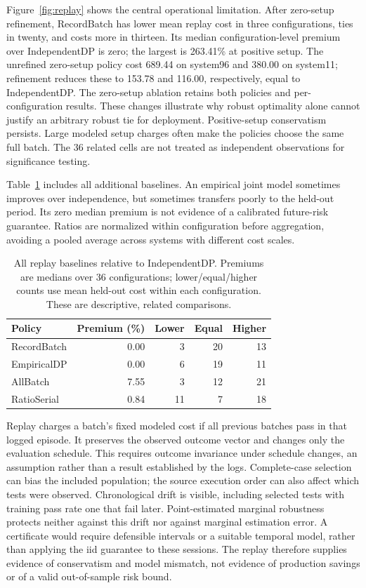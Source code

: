 \documentclass[runningheads]{llncs}
\begin{document}
Figure~\ref{fig:replay} shows the central operational limitation.
After zero-setup refinement, RecordBatch has lower mean replay cost in three
configurations, ties in twenty, and costs more in thirteen. Its median
configuration-level premium over IndependentDP is zero; the largest is
263.41\% at positive setup. The unrefined zero-setup policy cost 689.44 on
system96 and 380.00 on system11; refinement reduces these to 153.78 and
116.00, respectively, equal to IndependentDP. The zero-setup ablation retains
both policies and per-configuration results. These changes illustrate why
robust optimality alone cannot justify an arbitrary robust tie for deployment.
Positive-setup conservatism persists. Large modeled setup charges often make
the policies choose the same full batch. The 36 related cells are not treated
as independent observations for significance testing.

Table~\ref{tab:replay} includes all additional baselines. An empirical joint
model sometimes improves over independence, but sometimes transfers poorly
to the held-out period. Its zero median premium is not evidence of a calibrated
future-risk guarantee. Ratios are normalized within configuration before
aggregation, avoiding a pooled average across systems with different cost scales.

\begin{table}[t]
\caption{All replay baselines relative to IndependentDP. Premiums are medians
over 36 configurations; lower/equal/higher counts use mean held-out cost within
each configuration. These are descriptive, related comparisons.}
\label{tab:replay}
\centering
\begin{tabular}{lrrrr}
\toprule
Policy & Premium (\%) & Lower & Equal & Higher\\
\midrule
RecordBatch & 0.00 & 3 & 20 & 13\\
EmpiricalDP & 0.00 & 6 & 19 & 11\\
AllBatch & 7.55 & 3 & 12 & 21\\
RatioSerial & 0.84 & 11 & 7 & 18\\
\bottomrule
\end{tabular}
\end{table}

Replay charges a batch's fixed modeled cost if all previous batches pass in
that logged episode. It preserves the observed outcome vector and changes
only the evaluation schedule. This requires outcome invariance under schedule
changes, an assumption rather than a result established by the logs.
Complete-case selection can bias the included population; the source execution
order can also affect which tests were observed. Chronological drift is
visible, including selected tests with training pass rate one that fail later.
Point-estimated marginal robustness protects neither against this drift nor
against marginal estimation error. A certificate would require defensible
intervals or a suitable temporal model, rather than applying the iid guarantee
to these sessions. The replay therefore supplies evidence of conservatism
and model mismatch, not evidence of production savings or of a valid
out-of-sample risk bound.
\end{document}
